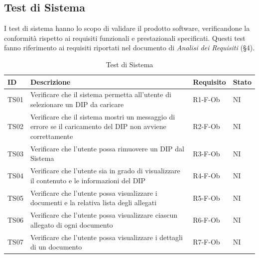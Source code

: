\documentclass[a4paper,12pt]{article}
\begin{document}
        \subsection{Test di Sistema}

        I test di sistema hanno lo scopo di validare il prodotto software, verificandone la conformità rispetto ai requisiti funzionali e prestazionali specificati.
        Questi test fanno riferimento ai requisiti riportati nel documento di \textit{Analisi dei Requisiti} (\S4).

            \begin{longtable}{|M{1.2cm}|M{6.3cm}|M{2.5cm}|M{1.5cm}|}
                
                \caption{Test di Sistema} \\
                \hline
                \textbf{ID} & \textbf{Descrizione} & \textbf{Requisito} & \textbf{Stato} \\
                \hline
                \endhead

                TS01 & Verificare che il sistema permetta all'utente di selezionare un DIP da caricare & R1-F-Ob & NI \\
                \hline

                TS02 & Verificare che il sistema mostri un messaggio di errore se il caricamento del DIP non avviene correttamente & R2-F-Ob & NI \\
                \hline

                TS03 & Verificare che l'utente possa rimuovere un DIP dal Sistema & R3-F-Ob & NI \\
                \hline

                TS04 & Verificare che l'utente sia in grado di visualizzare il contenuto e le informazioni del DIP & R4-F-Ob & NI \\
                \hline

                TS05 & Verificare che l'utente possa visualizzare i documenti e la relativa lista degli allegati & R5-F-Ob & NI \\
                \hline

                TS06 & Verificare che l'utente possa visualizzare ciascun allegato di ogni documento & R6-F-Ob & NI \\
                \hline

                TS07 & Verificare che l'utente possa visualizzare i dettagli di un documento & R7-F-Ob & NI \\
                \hline


\end{longtable}
\end{document}
